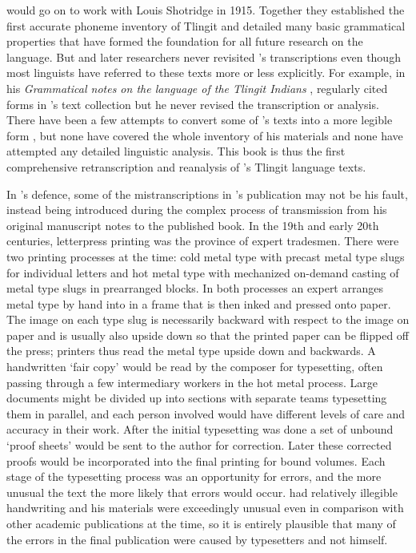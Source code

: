 \citeauthor{boas:1917} would go on to work with  Louis Shotridge in 1915.
Together they established the first accurate phoneme inventory of Tlingit and detailed many basic grammatical properties that have formed the foundation for all future research on the language.
But \citeauthor{boas:1917} and later researchers never revisited \citeauthor{swanton:1909}’s transcriptions even though most linguists have referred to these texts more or less explicitly.
For example, in his \textit{Grammatical notes on the language of the Tlingit Indians} \parencite{boas:1917}, \citeauthor{boas:1917} regularly cited forms in \citeauthor{swanton:1909}’s text collection but he never revised the transcription or analysis.
There have been a few attempts to convert some of \citeauthor{swanton:1909}’s texts into a more legible form \parencites{dauenhauer:1971b}{leer:1977}{littlefield-makinen:2003}, but none have covered the whole inventory of his materials and none have attempted any detailed linguistic analysis.
This book is thus the first comprehensive retranscription and reanalysis of \citeauthor{swanton:1909}’s Tlingit language texts.

In \citeauthor{swanton:1909}’s defence, some of the mistranscriptions in \citeauthor{swanton:1909}’s publication may not be his fault, instead being introduced during the complex process of transmission from his original manuscript notes to the published book.
In the 19th and early 20th centuries, letterpress printing was the province of expert tradesmen.
There were two printing processes at the time: cold metal type with precast metal type slugs for individual letters and hot metal type with mechanized on-demand casting of metal type slugs in prearranged blocks.
In both processes an expert arranges metal type by hand into in a frame that is then inked and pressed onto paper.
The image on each type slug is necessarily backward with respect to the image on paper and is usually also upside down so that the printed paper can be flipped off the press; printers thus read the metal type upside down and backwards.
A handwritten ‘fair copy’ would be read by the composer for typesetting, often passing through a few intermediary workers in the hot metal process.
Large documents might be divided up into sections with separate teams typesetting them in parallel, and each person involved would have different levels of care and accuracy in their work.
After the initial typesetting was done a set of unbound ‘proof sheets’ would be sent to the author for correction.
Later these corrected proofs would be incorporated into the final printing for bound volumes.
Each stage of the typesetting process was an opportunity for errors, and the more unusual the text the more likely that errors would occur.
\citeauthor{swanton:1909} had relatively illegible handwriting and his materials were exceedingly unusual even in comparison with other academic publications at the time, so it is entirely plausible that many of the errors in the final publication were caused by typesetters and not \citeauthor{swanton:1909} himself.

